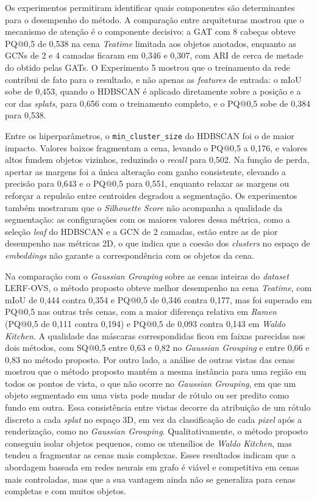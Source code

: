 Os experimentos permitiram identificar quais componentes são determinantes para o desempenho do método. A comparação entre arquiteturas mostrou que o mecanismo de atenção é o componente decisivo: a GAT com 8 cabeças obteve PQ@0,5 de 0,538 na cena \textit{Teatime} limitada aos objetos anotados, enquanto as GCNs de 2 e 4 camadas ficaram em 0,346 e 0,307, com ARI de cerca de metade do obtido pelas GATs. O Experimento 5 mostrou que o treinamento da rede contribui de fato para o resultado, e não apenas as \textit{features} de entrada: o mIoU sobe de 0,453, quando o HDBSCAN é aplicado diretamente sobre a posição e a cor das \emph{splats}, para 0,656 com o treinamento completo, e o PQ@0,5 sobe de 0,384 para 0,538.

Entre os hiperparâmetros, o \texttt{min\_cluster\_size} do HDBSCAN foi o de maior impacto. Valores baixos fragmentam a cena, levando o PQ@0,5 a 0,176, e valores altos fundem objetos vizinhos, reduzindo o \textit{recall} para 0,502. Na função de perda, apertar as margens foi a única alteração com ganho consistente, elevando a precisão para 0,643 e o PQ@0,5 para 0,551, enquanto relaxar as margens ou reforçar a repulsão entre centroides degradou a segmentação. Os experimentos também mostraram que o \textit{Silhouette Score} não acompanha a qualidade da segmentação: as configurações com os maiores valores dessa métrica, como a seleção \textit{leaf} do HDBSCAN e a GCN de 2 camadas, estão entre as de pior desempenho nas métricas 2D, o que indica que a coesão dos \textit{clusters} no espaço de \textit{embeddings} não garante a correspondência com os objetos da cena.

Na comparação com o \textit{Gaussian Grouping} sobre as cenas inteiras do \textit{dataset} LERF-OVS, o método proposto obteve melhor desempenho na cena \textit{Teatime}, com mIoU de 0,444 contra 0,354 e PQ@0,5 de 0,346 contra 0,177, mas foi superado em PQ@0,5 nas outras três cenas, com a maior diferença relativa em \textit{Ramen} (PQ@0,5 de 0,111 contra 0,194) e PQ@0,5 de 0,093 contra 0,143 em \textit{Waldo Kitchen}. A qualidade das máscaras correspondidas ficou em faixas parecidas nos dois métodos, com SQ@0,5 entre 0,63 e 0,82 no \textit{Gaussian Grouping} e entre 0,66 e 0,83 no método proposto. Por outro lado, a análise de outras vistas das cenas mostrou que o método proposto mantém a mesma instância para uma região em todos os pontos de vista, o que não ocorre no \textit{Gaussian Grouping}, em que um objeto segmentado em uma vista pode mudar de rótulo ou ser predito como fundo em outra. Essa consistência entre vistas decorre da atribuição de um rótulo discreto a cada \emph{splat} no espaço 3D, em vez da classificação de cada \textit{pixel} após a renderização, como no \textit{Gaussian Grouping}. Qualitativamente, o método proposto conseguiu isolar objetos pequenos, como os utensílios de \textit{Waldo Kitchen}, mas tendeu a fragmentar as cenas mais complexas. Esses resultados indicam que a abordagem baseada em redes neurais em grafo é viável e competitiva em cenas mais controladas, mas que a sua vantagem ainda não se generaliza para cenas completas e com muitos objetos.

